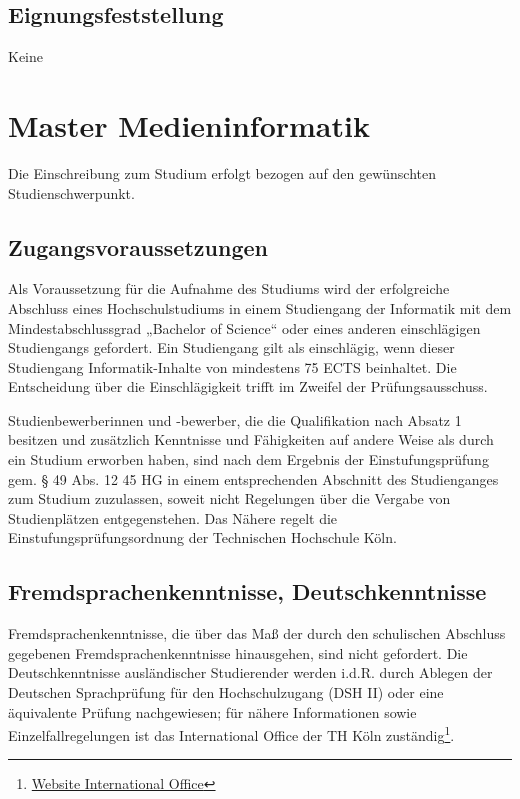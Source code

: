 \subsection{Eignungsfeststellung}\label{eignungsfeststellung}

Keine

\section{Master Medieninformatik}\label{master-medieninformatik-1}

Die Einschreibung zum Studium erfolgt bezogen auf den gewünschten
Studienschwerpunkt.

\subsection{Zugangsvoraussetzungen}\label{zugangsvoraussetzungen-1}

Als Voraussetzung für die Aufnahme des Studiums wird der erfolgreiche
Abschluss eines Hochschulstudiums in einem Studiengang der Informatik
mit dem Mindestabschlussgrad „Bachelor of Science`` oder eines anderen
einschlägigen Studiengangs gefordert. Ein Studiengang gilt als
einschlägig, wenn dieser Studiengang Informatik-Inhalte von mindestens
75 ECTS beinhaltet. Die Entscheidung über die Einschlägigkeit trifft im
Zweifel der Prüfungsausschuss.

Studienbewerberinnen und -bewerber, die die Qualifikation nach Absatz 1
besitzen und zusätzlich Kenntnisse und Fähigkeiten auf andere Weise als
durch ein Studium erworben haben, sind nach dem Ergebnis der
Einstufungsprüfung gem. § 49 Abs. 12 45 HG in einem entsprechenden
Abschnitt des Studienganges zum Studium zuzulassen, soweit nicht
Regelungen über die Vergabe von Studienplätzen entgegenstehen. Das
Nähere regelt die Einstufungsprüfungsordnung der Technischen Hochschule
Köln.

\subsection{Fremdsprachenkenntnisse,
Deutschkenntnisse}\label{fremdsprachenkenntnisse-deutschkenntnisse-1}

Fremdsprachenkenntnisse, die über das Maß der durch den schulischen
Abschluss gegebenen Fremdsprachenkenntnisse hinausgehen, sind nicht
gefordert. Die Deutschkenntnisse ausländischer Studierender werden
i.d.R. durch Ablegen der Deutschen Sprachprüfung für den Hochschulzugang
(DSH II) oder eine äquivalente Prüfung nachgewiesen; für nähere
Informationen sowie Einzelfallregelungen ist das International Office
der TH Köln zuständig\footnote{\href{https://www.th-koeln.de/internationales/international-office_1986.php}{Website
  International Office}}.


